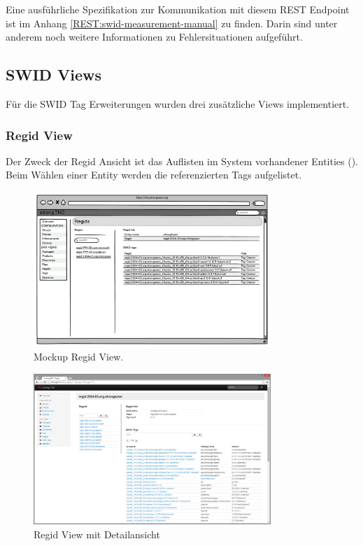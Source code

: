 Eine ausführliche Spezifikation zur Kommunikation mit diesem REST Endpoint ist im Anhang \autoref{REST:swid-measurement-manual} zu finden.
Darin sind unter anderem noch weitere Informationen zu Fehlersituationen aufgeführt.

\subsection{SWID Views}
Für die SWID Tag Erweiterungen wurden drei zusätzliche Views implementiert.
\subsubsection{Regid View}
Der Zweck der Regid Ansicht ist das Auflisten im System vorhandener Entities ().
Beim Wählen einer Entity werden die referenzierten Tags aufgelistet. 
\begin{figure}[H]
\centering
\includegraphics[width=0.8\textwidth]{./images/mockups/swid-regid-view}
\caption{Mockup Regid View.}
\label{fig:swid-regid-view}
\end{figure}
\begin{figure}[H]
\centering
\includegraphics[width=0.8\textwidth]{./images/Views/regid-view}
\caption{Regid View mit Detailansicht}
\label{fig:regid-view}
\end{figure}

